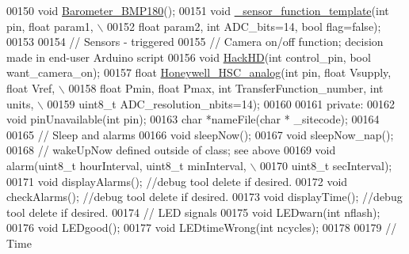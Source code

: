 \begin{DoxyCode}
00150     \textcolor{keywordtype}{void} \hyperlink{classLogger_a40588117a274f0c6de926ef6ce1f0ba8}{Barometer\_BMP180}();
00151     \textcolor{keywordtype}{void} \hyperlink{classLogger_a98f3cc370c87d1e1eaf3eb6a7e0f1623}{\_sensor\_function\_template}(\textcolor{keywordtype}{int} pin, \textcolor{keywordtype}{float} param1, \(\backslash\)
00152          \textcolor{keywordtype}{float} param2, \textcolor{keywordtype}{int} ADC\_bits=14, \textcolor{keywordtype}{bool} flag=\textcolor{keyword}{false});
00153     
00154     \textcolor{comment}{// Sensors - triggered}
00155     \textcolor{comment}{// Camera on/off function; decision made in end-user Arduino script}
00156     \textcolor{keywordtype}{void} \hyperlink{classLogger_a923b296832bd4222da649ebc66427ac1}{HackHD}(\textcolor{keywordtype}{int} control\_pin, \textcolor{keywordtype}{bool} want\_camera\_on);
00157     \textcolor{keywordtype}{float} \hyperlink{classLogger_a9808967fdf91f10602aa883df35145b3}{Honeywell\_HSC\_analog}(\textcolor{keywordtype}{int} pin, \textcolor{keywordtype}{float} Vsupply, \textcolor{keywordtype}{float} Vref, \(\backslash\)
00158           \textcolor{keywordtype}{float} Pmin, \textcolor{keywordtype}{float} Pmax, \textcolor{keywordtype}{int} TransferFunction\_number, \textcolor{keywordtype}{int} units, \(\backslash\)
00159           uint8\_t ADC\_resolution\_nbits=14);
00160 
00161   \textcolor{keyword}{private}:
00162     \textcolor{keywordtype}{void} pinUnavailable(\textcolor{keywordtype}{int} pin);
00163     \textcolor{keywordtype}{char} *nameFile(\textcolor{keywordtype}{char} * \_sitecode);
00164 
00165     \textcolor{comment}{// Sleep and alarms}
00166     \textcolor{keywordtype}{void} sleepNow();
00167     \textcolor{keywordtype}{void} sleepNow\_nap();
00168     \textcolor{comment}{// wakeUpNow defined outside of class; see above}
00169     \textcolor{keywordtype}{void} alarm(uint8\_t hourInterval, uint8\_t minInterval, \(\backslash\)
00170          uint8\_t secInterval);
00171     \textcolor{keywordtype}{void} displayAlarms(); \textcolor{comment}{//debug tool delete if desired.}
00172     \textcolor{keywordtype}{void} checkAlarms();  \textcolor{comment}{//debug tool delete if desired. }
00173     \textcolor{keywordtype}{void} displayTime();   \textcolor{comment}{//debug tool delete if desired. }
00174     \textcolor{comment}{// LED signals}
00175     \textcolor{keywordtype}{void} LEDwarn(\textcolor{keywordtype}{int} nflash);
00176     \textcolor{keywordtype}{void} LEDgood();
00177     \textcolor{keywordtype}{void} LEDtimeWrong(\textcolor{keywordtype}{int} ncycles);
00178     
00179     \textcolor{comment}{// Time}

\end{DoxyCode}
